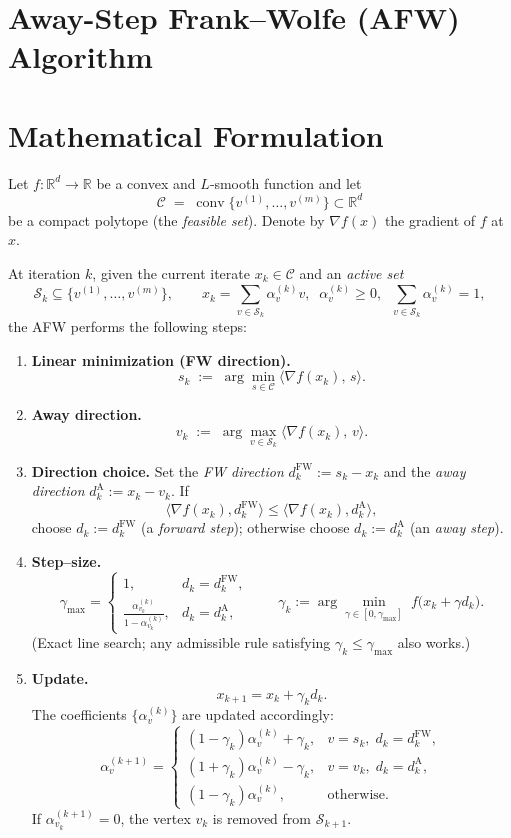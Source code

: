 \documentclass{article}
\begin{document}
\section*{Away-Step Frank–Wolfe (AFW) Algorithm}

\section*{Mathematical Formulation}
Let $f:\mathbb{R}^d\to\mathbb{R}$ be a convex and $L$‑smooth function and let 
\[
\mathcal{C}\;=\;\operatorname{conv}\{v^{(1)},\dots ,v^{(m)}\}\subset\mathbb{R}^d
\]
be a compact polytope (the \emph{feasible set}).  
Denote by $\nabla f(x)$ the gradient of $f$ at $x$.

At iteration $k$, given the current iterate $x_k\in\mathcal{C}$ and an \emph{active set}
\[
\mathcal{S}_k\subseteq\{v^{(1)},\dots ,v^{(m)}\},\qquad 
x_k=\sum_{v\in\mathcal{S}_k}\alpha_v^{(k)} v,\;\; \alpha_v^{(k)}\ge 0,\;\; \sum_{v\in\mathcal{S}_k}\alpha_v^{(k)}=1,
\]
the AFW performs the following steps:

\begin{enumerate}[label=\arabic*)]
\item \textbf{Linear minimization (FW direction).}
\[
s_k \;:=\; \arg\min_{s\in\mathcal{C}} \langle \nabla f(x_k),\, s\rangle .
\]
\item \textbf{Away direction.}
\[
v_k \;:=\; \arg\max_{v\in\mathcal{S}_k}\langle \nabla f(x_k),\, v\rangle .
\]
\item \textbf{Direction choice.}
Set the \emph{FW direction} $d^{\text{FW}}_k:= s_k-x_k$ and the \emph{away direction}
$d^{\text{A}}_k:= x_k- v_k$.  
If
\[
\langle \nabla f(x_k), d^{\text{FW}}_k\rangle \le \langle \nabla f(x_k), d^{\text{A}}_k\rangle,
\]
choose $d_k:=d^{\text{FW}}_k$ (a \emph{forward step}); otherwise choose $d_k:=d^{\text{A}}_k$ (an \emph{away step}).
\item \textbf{Step–size.}
\[
\gamma_{\max}= 
\begin{cases}
1, & d_k = d^{\text{FW}}_k,\\[4pt]
\displaystyle\frac{\alpha_{v_k}^{(k)}}{1-\alpha_{v_k}^{(k)}}, & d_k = d^{\text{A}}_k,
\end{cases}
\qquad 
\gamma_k:=\arg\min_{\gamma\in[0,\gamma_{\max}]}\; f\bigl(x_k+\gamma d_k\bigr).
\]
(Exact line search; any admissible rule satisfying $\gamma_k\le \gamma_{\max}$ also works.)
\item \textbf{Update.}
\[
x_{k+1}=x_k+\gamma_k d_k .
\]
The coefficients $\{\alpha_v^{(k)}\}$ are updated accordingly:
\[
\alpha_v^{(k+1)}=
\begin{cases}
(1-\gamma_k)\alpha_v^{(k)}+\gamma_k, & v=s_k,\; d_k=d^{\text{FW}}_k,\\[4pt]
(1+\gamma_k)\alpha_v^{(k)}-\gamma_k, & v=v_k,\; d_k=d^{\text{A}}_k,\\[4pt]
(1-\gamma_k)\alpha_v^{(k)}, & \text{otherwise}.
\end{cases}
\]
If $\alpha_{v_k}^{(k+1)}=0$, the vertex $v_k$ is removed from $\mathcal{S}_{k+1}$.
\end{enumerate}
\end{document}
